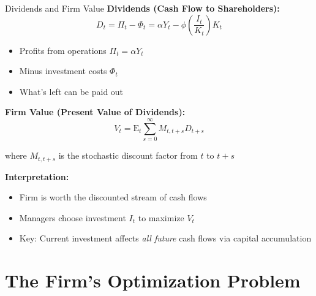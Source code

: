 \documentclass{beamer}
\begin{document}
\begin{frame}{Dividends and Firm Value}
    \textbf{Dividends (Cash Flow to Shareholders):}
    \begin{equation}\label{equ:dividend}
        D_t = \Pi_t - \Phi_t = \alpha Y_t - \phi\left(\frac{I_t}{K_t}\right) K_t
    \end{equation}
    
    \begin{itemize}
        \item Profits from operations $\Pi_t = \alpha Y_t$
        \item Minus investment costs $\Phi_t$
        \item What's left can be paid out
    \end{itemize}
    
    
    \textbf{Firm Value (Present Value of Dividends):}
    \begin{equation}\label{equ:firm value}
        V_t = \mathrm{E}_t \sum_{s=0}^{\infty} M_{t,t+s} D_{t+s}
    \end{equation}
    
    where $M_{t,t+s}$ is the stochastic discount factor from $t$ to $t+s$
    
    
    \textbf{Interpretation:}
    \begin{itemize}
        \item Firm is worth the discounted stream of cash flows
        \item Managers choose investment $I_t$ to maximize $V_t$
        \item Key: Current investment affects \textit{all future} cash flows via capital accumulation
    \end{itemize}
\end{frame}

\section{The Firm's Optimization Problem}
\end{document}
